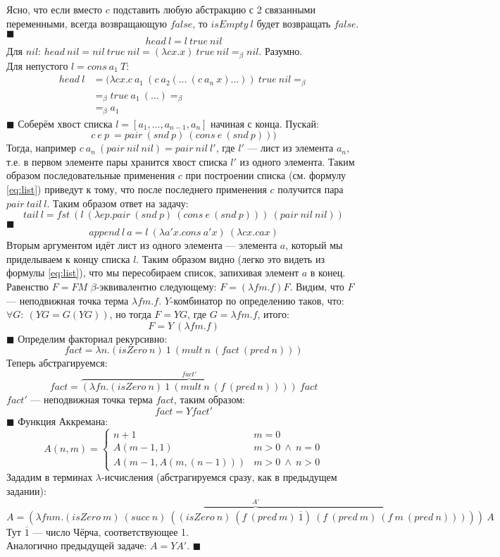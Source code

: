 Ясно, что если вместо $c$ подставить любую абстракцию с 2 связанными переменными, всегда возвращающую $false$, то $isEmpty\ l$ будет возвращать $false$. \hfill $\blacksquare$
\[ head\ l =  l\ true\ nil\]
Для $nil$: $head\ nil = nil\ true\ nil = (\lambda cx.x)\ true\ nil =_\beta nil$. Разумно.\\
Для непустого $l = cons\ a_1\ T$: 
\begin{align*}
head\ l &= (\lambda cx.c\ a_1\ (c\ a_2(\ldots\ (c\ a_n\ x)\ldots))\ true\ nil =_\beta \\
	    &=_\beta true\ a_1\ (\ldots) =_\beta \\
	    &=_\beta a_1
\end{align*}
\hfill $\blacksquare$
Соберём хвост списка $l = [a_1,\ldots,a_{n-1},a_n]$ начиная с конца. Пускай:
\[c\ e\ p\ = pair\ (snd\ p)\ (cons\ e\ (snd\ p)))\]
Тогда, например $c\ a_n\ (pair\ nil\ nil) = pair\ nil\ l'$, где $l'$ --- лист из элемента $a_n$, т.е. в первом элементе пары хранится хвост списка $l'$ из одного элемента. Таким образом последовательные применения $c$ при построении списка (см. формулу \ref{eq:list}) приведут к тому, что после последнего применения $c$ получится пара $pair\ tail\ l$. Таким образом ответ на задачу:
\[tail\ l = fst\ (l\ (\lambda ep.pair\ (snd\ p)\ (cons\ e\ (snd\ p)))\ (pair\ nil\ nil))\]
\hfill $\blacksquare$
{ \color{red}  }
\[ append\ l\ a =  l\ (\lambda a'x.cons\ a'x)\ (\lambda cx.cax)\]
Вторым аргументом идёт лист из одного элемента --- элемента $a$, который мы приделываем к концу списка $l$.
Таким образом видно (легко это видеть из формулы \ref{eq:list}), что мы пересобираем список, запихивая элемент $a$ в конец.
Равенство $F=FM$ $\beta$-эквивалентно следующему: $F=(\lambda fm.f)F$. Видим, что $F$ --- неподвижная точка терма $\lambda fm.f$.
$Y$-комбинатор по определению таков, что: $\forall G:\ (YG=G(YG))$, но тогда $F=YG$, где $G=\lambda fm.f$, итого:
\[
	F = Y\ (\lambda fm.f)
\]
\hfill $\blacksquare$
Определим факториал рекурсивно:
\[
	fact = \lambda n.(isZero\ n)\ 1\ (mult\ n\ (fact\ (pred\ n)))
\]
Теперь абстрагируемся:
\[
 	fact = \overbrace{(\lambda fn.(isZero\ n)\ 1\ (mult\ n\ (f\ (pred\ n))))}^{fact'}\ fact
\]
$fact'$ --- неподвижная точка терма $fact$, таким образом:
\[
	fact = Yfact'
\]
\hfill $\blacksquare$
Функция Аккремана:
\[
A(n, m) = 
\begin{cases}
n + 1 & m = 0 \\
A(m-1,1) & m > 0\ \land\ n = 0 \\
A(m-1,A(m,(n-1))) & m > 0\ \land\ n > 0
\end{cases}
\]
Зададим в терминах $\lambda$-исчисления (абстрагируемся сразу, как в предыдущем задании):
\[
A = \overbrace{(\lambda fnm.(isZero\ m)\ (succ\ n)\ ((isZero\ n)\ (f\ (pred\ m)\ \overline{1})\ (f\ (pred\ m)\ (f\ m\ (pred\ n)))))}^{A'}\ A
\]
Тут $\overline{1}$ --- число Чёрча, соответствующее 1.\\
Аналогично предыдущей задаче: $A = YA'$. \hfill $\blacksquare$

